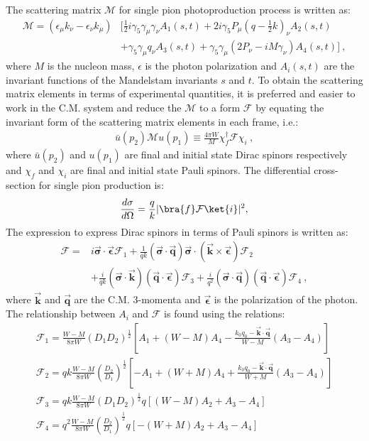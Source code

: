 The scattering matrix $\mathcal{M}$ for single pion photoproduction process is written as:
\begin{align}
\mathcal{M} =  (\epsilon_\mu k_\nu - \epsilon_\nu k_\mu)&[ \frac{1}{2}i \gamma_5 \gamma_\mu \gamma_\nu A_1(s,t) + 2 i \gamma_5 P_\mu(q-\frac{1}{2}k)_\nu A_2(s,t) \nonumber \\ & + \gamma_5 \gamma_\mu q_\nu A_3(s,t) + \gamma_5 \gamma_\mu(2P_\nu- i M\gamma_\nu) A_4(s,t) ] \ ,
\end{align}
where $M$ is the nucleon mass, $\epsilon$ is the photon polarization and $A_i(s,t)$ are the invariant functions of the Mandelstam invariants $s$ and $t$. To obtain the scattering matrix elements in terms of experimental quantities, it is preferred and easier to work in the C.M. system and reduce the $\mathcal{M}$ to a form $\mathcal{F}$ by equating the invariant form of the scattering matrix elements in each frame, i.e.:
\begin{align}
\bar{u}(p_2)\mathcal{M} u(p_1) \equiv \frac{4 \pi W}{M}\chi_f^\dagger \mathcal{F} \chi_i \ ,
\end{align}
where $\bar{u}(p_2)$ and $u(p_1)$ are final and initial state Dirac spinors respectively and $\chi_f$ and $\chi_i$ are final and initial state Pauli spinors. The differential cross-section for single pion production is:
\begin{align}
\frac{d\sigma}{d\Omega} = \frac{q}{k}| \bra{f}\mathcal F \ket{i}|^2,
\end{align}
The expression to express Dirac spinors in terms of Pauli spinors is written as:
\begin{align}
\mathcal{F} = & i\vec{\mathbf{\sigma}}\cdot \vec{\mathbf{\epsilon}} \mathcal{F}_1 + \frac{1}{qk}(\vec{\mathbf{\sigma}}\cdot \vec{\mathbf{q}})\vec{\mathbf{\sigma}} \cdot(\vec{\mathbf{k}}\times \vec{\mathbf{\epsilon}}) \mathcal{F}_2 \nonumber \\ & + \frac{i}{qk}(\vec{\mathbf{\sigma}}\cdot \vec{\mathbf{k}})(\vec{\mathbf{q}}\cdot \vec{\mathbf{\epsilon}})\mathcal{F}_3 + \frac{i}{q^2}(\vec{\mathbf{\sigma}}\cdot \vec{\mathbf{q}})(\vec{\mathbf{q}}\cdot \vec{\mathbf{\epsilon}})\mathcal{F}_4 \ ,
\end{align}
where $\vec{\mathbf{k}}$ and $\vec{\mathbf{q}}$ are the C.M. 3-momenta and $\vec{\mathbf{\epsilon}}$ is the polarization of the photon. The relationship between $A_i$ and $\mathcal{F}$ is found using the relations:
\begin{align}
\mathcal{F}_1 = \frac{W- M}{8 \pi W }(D_1 D_2)^{\frac{1}{2}}\left[ A_1+(W-M)A_4 - \frac{k_0q_0-\vec{\mathbf{k}}\cdot \vec{\mathbf{q}}}{W-M}(A_3-A_4)\right] \\
\mathcal{F}_2 = qk \frac{W- M}{8 \pi W }(\frac{D_2}{D_1})^{\frac{1}{2}}\left[ -A_1+(W+M)A_4 + \frac{k_0q_0-\vec{\mathbf{k}}\cdot \vec{\mathbf{q}}}{W+M}(A_3-A_4)\right]  \\
\mathcal{F}_3 =qk \frac{W- M}{8 \pi W }(D_1 D_2)^{\frac{1}{2}}q\left[(W-M)A_2 + A_3 - A_4\right]\\
\mathcal{F}_4 = q^2 \frac{W- M}{8 \pi W }(\frac{D_2}{D_1})^{\frac{1}{2}}q\left[ -(W+M)A_2 + A_3 - A_4\right] 
\end{align}
